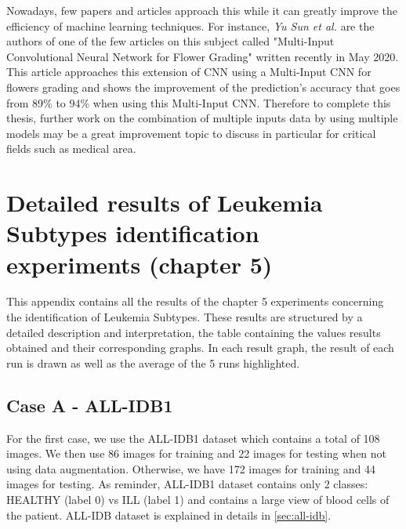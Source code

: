 \documentclass[11pt, openany]{report}
\theoremstyle{plain}
\theoremstyle{definition}
\theoremstyle{remark}
\begin{document}
Nowadays, few papers and articles approach this while it can greatly improve the efficiency of machine learning techniques. For instance, \textit{Yu Sun et al.} are the authors of one of the few articles on this subject called "Multi-Input Convolutional Neural Network for Flower Grading" \cite{flowers-article} written recently in May 2020. This article approaches this extension of CNN using a Multi-Input CNN for flowers grading and shows the improvement of the prediction's accuracy that goes from 89\% to 94\% when using this Multi-Input CNN. Therefore to complete this thesis, further work on the combination of multiple inputs data by using multiple models may be a great improvement topic to discuss in particular for critical fields such as medical area.  




\nocite{*}





\newpage
\appendix

\chapter{Detailed results of Leukemia Subtypes identification experiments (chapter 5)}

This appendix contains all the results of the chapter 5 experiments concerning the identification of Leukemia Subtypes. These results are structured by a detailed description and interpretation, the table containing the values results obtained and their corresponding graphs. In each result graph, the result of each run is drawn as well as the average of the 5 runs highlighted. 



\section{Case A - ALL-IDB1} \label{sec:appendix-case-A}

For the first case, we use the ALL-IDB1 dataset which contains a total of 108 images. We then use 86 images for training and 22 images for testing when not using data augmentation. Otherwise, we have 172 images for training and 44 images for testing. As reminder, ALL-IDB1 dataset contains only 2 classes: HEALTHY (label 0) vs ILL (label 1) and contains a large view of blood cells of the patient. ALL-IDB dataset is explained in details in \autoref{sec:all-idb}.    
\end{document}
